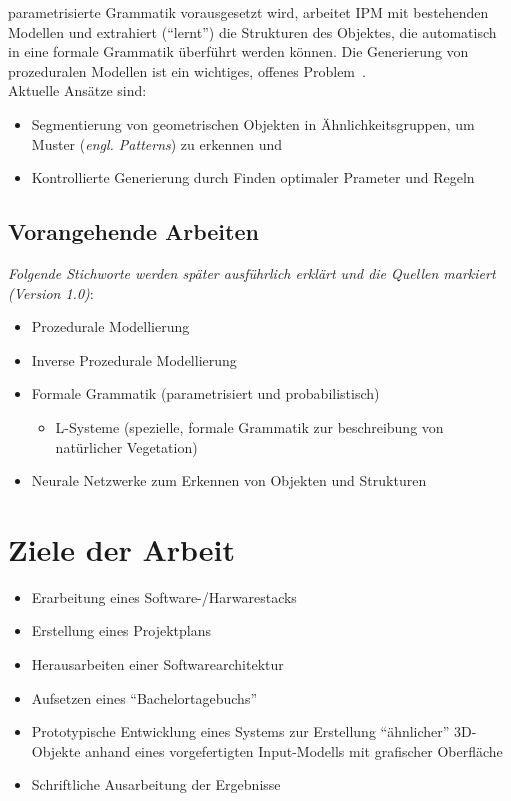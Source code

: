 \documentclass[11pt]{article}
\begin{document}
    parametrisierte Grammatik vorausgesetzt wird, arbeitet IPM mit bestehenden Modellen und extrahiert ("`lernt"')
    die Strukturen des Objektes, die automatisch in eine formale Grammatik überführt werden können.
    Die Generierung von prozeduralen Modellen ist ein wichtiges, offenes Problem~\cite{2}.\\
    Aktuelle Ansätze sind:
    \begin{itemize}
        \item Segmentierung von geometrischen Objekten in Ähnlichkeitsgruppen, um Muster (\textit{engl. Patterns}) zu
        erkennen und
        \item Kontrollierte Generierung durch Finden optimaler Prameter und Regeln
    \end{itemize}

    \subsection{Vorangehende Arbeiten}
    \textit{Folgende Stichworte werden später ausführlich erklärt und die Quellen markiert (Version 1.0)}:
    \begin{itemize}
        \item Prozedurale Modellierung
        \item Inverse Prozedurale Modellierung
        \item Formale Grammatik (parametrisiert und probabilistisch)
        \begin{itemize}
            \item L-Systeme (spezielle, formale Grammatik zur beschreibung von natürlicher Vegetation)
        \end{itemize}
        \item Neurale Netzwerke zum Erkennen von Objekten und Strukturen
    \end{itemize}


    \section{Ziele der Arbeit}
    \begin{itemize}
        \item Erarbeitung eines Software-/Harwarestacks
        \item Erstellung eines Projektplans
        \item Herausarbeiten einer Softwarearchitektur
        \item Aufsetzen eines "`Bachelortagebuchs"'
        \item Prototypische Entwicklung eines Systems zur Erstellung "`ähnlicher"' 3D-Objekte anhand eines
        vorgefertigten Input-Modells mit grafischer Oberfläche
        \item Schriftliche Ausarbeitung der Ergebnisse
    \end{itemize}
\end{document}
